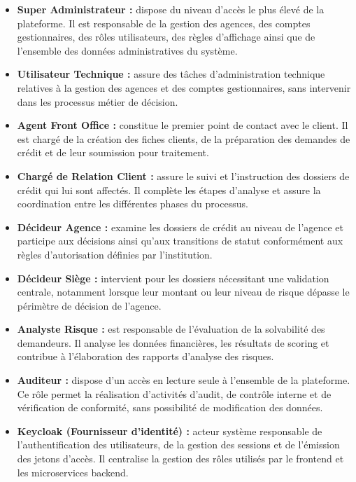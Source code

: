 \begin{itemize}

    \item[\ding{226}] \textbf{Super Administrateur :} dispose du niveau d'accès le plus
    élevé de la plateforme. Il est responsable de la gestion des agences, des comptes
    gestionnaires, des rôles utilisateurs, des règles d'affichage ainsi que de l'ensemble
    des données administratives du système.

    \item[\ding{226}] \textbf{Utilisateur Technique :} assure des tâches d'administration
    technique relatives à la gestion des agences et des comptes gestionnaires, sans
    intervenir dans les processus métier de décision.

    \item[\ding{226}] \textbf{Agent Front Office :} constitue le premier point de contact
    avec le client. Il est chargé de la création des fiches clients, de la préparation des
    demandes de crédit et de leur soumission pour traitement.

    \item[\ding{226}] \textbf{Chargé de Relation Client :} assure le suivi et l'instruction
    des dossiers de crédit qui lui sont affectés. Il complète les étapes d'analyse et assure
    la coordination entre les différentes phases du processus.

    \item[\ding{226}] \textbf{Décideur Agence :} examine les dossiers de crédit au niveau
    de l'agence et participe aux décisions ainsi qu'aux transitions de statut conformément
    aux règles d'autorisation définies par l'institution.

    \item[\ding{226}] \textbf{Décideur Siège :} intervient pour les dossiers nécessitant
    une validation centrale, notamment lorsque leur montant ou leur niveau de risque dépasse
    le périmètre de décision de l'agence.

    \item[\ding{226}] \textbf{Analyste Risque :} est responsable de l'évaluation de la
    solvabilité des demandeurs. Il analyse les données financières, les résultats de scoring
    et contribue à l'élaboration des rapports d'analyse des risques.

    \item[\ding{226}] \textbf{Auditeur :} dispose d'un accès en lecture seule à l'ensemble
    de la plateforme. Ce rôle permet la réalisation d'activités d'audit, de contrôle interne
    et de vérification de conformité, sans possibilité de modification des données.

    \item[\ding{226}] \textbf{Keycloak (Fournisseur d'identité) :} acteur système
    responsable de l'authentification des utilisateurs, de la gestion des sessions et de
    l'émission des jetons d'accès. Il centralise la gestion des rôles utilisés par le
    frontend et les microservices backend.

\end{itemize}

